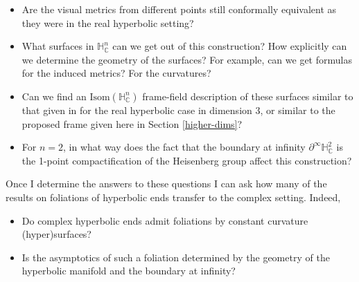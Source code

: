 \documentclass[11pt]{amsart}
\newcommand{\C}{\mathbb{C}}
\renewcommand{\H}{\mathbb{H}}
\begin{document}
\begin{itemize}

\item Are the visual metrics from different points still conformally equivalent as they were in the real hyperbolic setting?

\item What surfaces in $\H_{\C}^n$ can we get out of this construction? How explicitly can we determine the geometry of the surfaces? For example, can we get formulas for the induced metrics? For the curvatures?

\item Can we find an $\mathrm{Isom}(\H_{\C}^n)$ frame-field description of these surfaces similar to that given in \cite{dumas2017} for the real hyperbolic case in dimension 3, or similar to the proposed frame given here in Section \ref{higher-dims}?

\item For $n=2$, in what way does the fact that the boundary at infinity $\partial^\infty \H_{\C}^2$ is the 1-point compactification of the Heisenberg group affect this construction?

\end{itemize}
Once I determine the answers to these questions I can ask how many of the results on foliations of hyperbolic ends transfer to the complex setting. Indeed,
\begin{itemize}

\item Do complex hyperbolic ends admit foliations by constant curvature (hyper)surfaces?

\item Is the asymptotics of such a foliation determined by the geometry of the hyperbolic manifold and the boundary at infinity?

\end{itemize}






\end{document}
